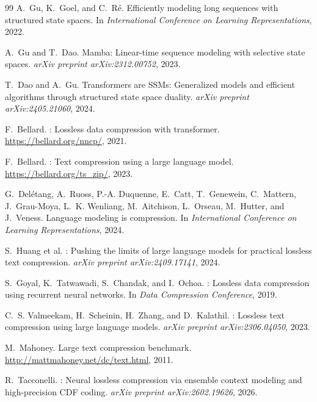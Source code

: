 \documentclass[10pt,twocolumn]{article}
\begin{document}
\begin{thebibliography}{99}
A.~Gu, K.~Goel, and C.~R\'{e}.
\newblock Efficiently modeling long sequences with structured state spaces.
\newblock In \emph{International Conference on Learning Representations}, 2022.

A.~Gu and T.~Dao.
\newblock Mamba: Linear-time sequence modeling with selective state spaces.
\newblock \emph{arXiv preprint arXiv:2312.00752}, 2023.

T.~Dao and A.~Gu.
\newblock Transformers are {SSMs}: Generalized models and efficient algorithms
  through structured state space duality.
\newblock \emph{arXiv preprint arXiv:2405.21060}, 2024.

F.~Bellard.
: Lossless data compression with transformer.
\newblock \url{https://bellard.org/nncp/}, 2021.

F.~Bellard.
: Text compression using a large language model.
\newblock \url{https://bellard.org/ts_zip/}, 2023.

G.~Del\'{e}tang, A.~Ruoss, P.-A. Duquenne, E.~Catt, T.~Genewein,
C.~Mattern, J.~Grau-Moya, L.~K. Wenliang, M.~Aitchison, L.~Orseau, M.~Hutter, and J.~Veness.
\newblock Language modeling is compression.
\newblock In \emph{International Conference on Learning Representations}, 2024.

S.~Huang et al.
: Pushing the limits of large language models for practical
  lossless text compression.
\newblock \emph{arXiv preprint arXiv:2409.17141}, 2024.

S.~Goyal, K.~Tatwawadi, S.~Chandak, and I.~Ochoa.
: Lossless data compression using recurrent neural networks.
\newblock In \emph{Data Compression Conference}, 2019.

C.~S. Valmeekam, H.~Scheinin, H.~Zhang, and D.~Kalathil.
: Lossless text compression using large language models.
\newblock \emph{arXiv preprint arXiv:2306.04050}, 2023.

M.~Mahoney.
\newblock Large text compression benchmark.
\newblock \url{http://mattmahoney.net/dc/text.html}, 2011.

R.~Tacconelli.
: Neural lossless compression via ensemble context modeling
  and high-precision {CDF} coding.
\newblock \emph{arXiv preprint arXiv:2602.19626}, 2026.

\end{thebibliography}
\end{document}
